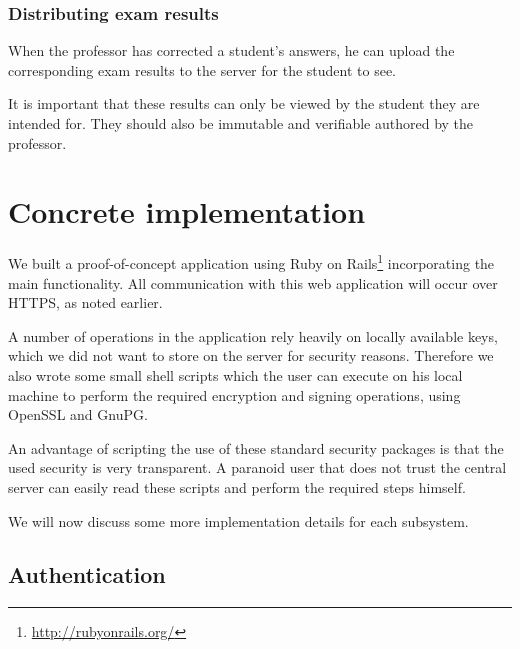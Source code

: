 \documentclass[12pt]{article}
\begin{document}
\subsubsection{Distributing exam results}
\label{subsubsec:req-func-results}


When the professor has corrected a student's answers, he can upload the
corresponding exam results to the server for the student to see.

It is important that these results can only be viewed by the student they are
intended for. They should also be immutable and verifiable authored by the
professor.

\section{Concrete implementation}
\label{sec:implementation}


We built a proof-of-concept application using Ruby on
Rails\footnote{\url{http://rubyonrails.org/}} incorporating the main
functionality. All communication with this web application will occur over HTTPS,
as noted earlier.

A number of operations in the application rely heavily on locally available
keys, which we did not want to store on the server for security reasons.
Therefore we also wrote some small shell scripts which the user can execute on
his local machine to perform the required encryption and signing operations,
using OpenSSL and GnuPG.

An advantage of scripting the use of these standard security packages is that
the used security is very transparent. A paranoid user that does not trust the
central server can easily read these scripts and perform the required steps
himself.

We will now discuss some more implementation details for each subsystem.

\subsection{Authentication}
\label{subsec:impl-authentication}
\end{document}
